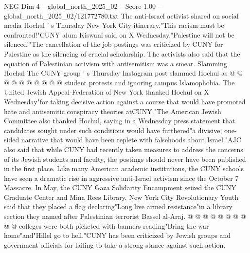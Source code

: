 \begin{textsample}{NEG Dim 4 – global\_north\_2025\_02 – Score 1.00 – global\_north\_2025\_02/121772780.txt}
The anti-Israel activist shared on social media Hochul ' s Thursday New York City itinerary."This racism must be confronted!"CUNY alum Kiswani said on X Wednesday."Palestine will not be silenced!"The cancellation of the job postings was criticized by CUNY for Palestine as the silencing of crucial scholarship.
The activists also said that the equation of Palestinian activism with antisemitism was a smear.
Slamming Hochul The CUNY group ' s Thursday Instagram post slammed Hochul as @ @ @ @ @ @ @ @ @ @ student protests and ignoring campus Islamophobia.
The United Jewish Appeal-Federation of New York thanked Hochul on X Wednesday"for taking decisive action against a course that would have promoted hate and antisemitic conspiracy theories atCUNY."The American Jewish Committee also thanked Hochul, saying in a Wednesday press statement that candidates sought under such conditions would have furthered"a divisive, one-sided narrative that would have been replete with falsehoods about Israel."AJC also said that while CUNY had recently taken measures to address the concerns of its Jewish students and faculty, the postings should never have been published in the first place.
Like many American academic institutions, the CUNY schools have seen a dramatic rise in aggressive anti-Israel activism since the October 7 Massacre.
In May, the CUNY Gaza Solidarity Encampment seized the CUNY Graduate Center and Mina Rees Library.
New York City Revolutionary Youth said that they placed a flag declaring"Long live armed resistance"in a library section they named after Palestinian terrorist Bassel al-Araj. @ @ @ @ @ @ @ @ @ @ colleges were both picketed with banners reading"Bring the war home"and"Hillel go to hell."CUNY has been criticized by Jewish groups and government officials for failing to take a strong stance against such action.

\end{textsample}
